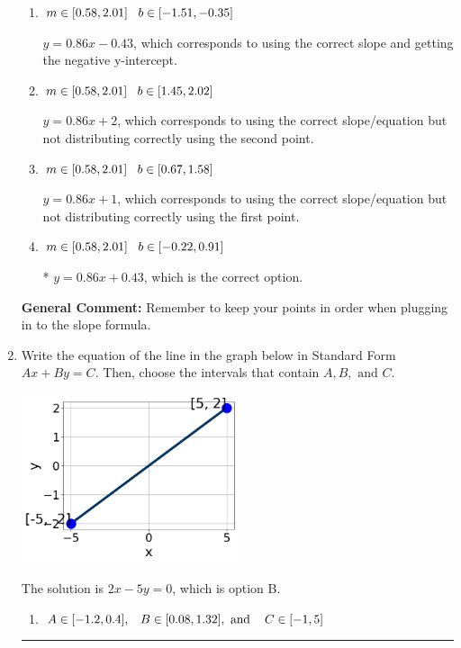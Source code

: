 \documentclass{extbook}[14pt]
\newcommand{\litem}[1]{\item #1

\rule{\textwidth}{0.4pt}}
\begin{document}
\begin{enumerate}
{\begin{enumerate}[label=\Alph*.]
 $y = -0.86x -18.43$, which corresponds to using the negative slope and the correct equation.
\item \( m \in [0.58, 2.01] \hspace*{3mm} b \in [-1.51, -0.35] \)

 $y = 0.86x -0.43$, which corresponds to using the correct slope and getting the negative y-intercept.
\item \( m \in [0.58, 2.01] \hspace*{3mm} b \in [1.45, 2.02] \)

 $y = 0.86x + 2$, which corresponds to using the correct slope/equation but not distributing correctly using the second point.
\item \( m \in [0.58, 2.01] \hspace*{3mm} b \in [0.67, 1.58] \)

 $y = 0.86x + 1$, which corresponds to using the correct slope/equation but not distributing correctly using the first point.
\item \( m \in [0.58, 2.01] \hspace*{3mm} b \in [-0.22, 0.91] \)

* $y = 0.86x + 0.43$, which is the correct option.
\end{enumerate}

\textbf{General Comment:} Remember to keep your points in order when plugging in to the slope formula.
}
\litem{
Write the equation of the line in the graph below in Standard Form $Ax+By=C$. Then, choose the intervals that contain $A, B, \text{ and } C$.

\begin{center}
    \includegraphics[width=0.5\textwidth]{../Figures/linearGraphToStandardC.png}
\end{center}


The solution is \( 2x - 5y = 0 \), which is option B.\begin{enumerate}[label=\Alph*.]
\item \( A \in [-1.2, 0.4], \hspace{3mm} B \in [0.08, 1.32], \text{ and } \hspace{3mm} C \in [-1, 5] \)


\end{enumerate}}
\end{enumerate}
\end{document}
